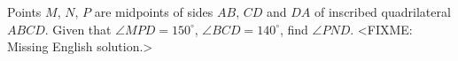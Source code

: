 \problem
Points $M$, $N$, $P$ are midpoints of sides $AB$, $CD$ and $DA$ of inscribed
quadrilateral $ABCD$.
Given that $\angle MPD = 150^\circ$, $\angle BCD = 140^\circ$, find
$\angle PND$.
\solution
<FIXME: Missing English solution.>
\endproblem
